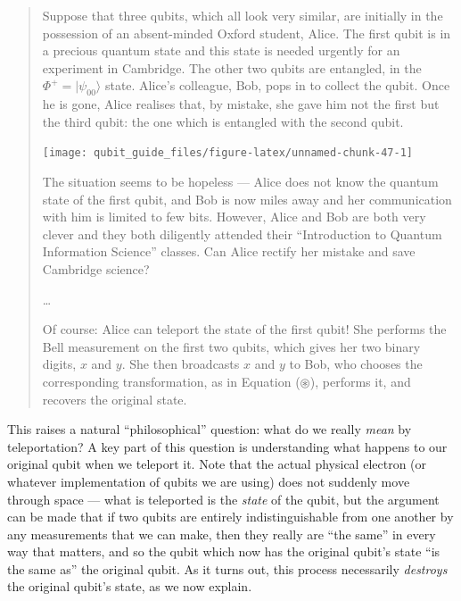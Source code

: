 \documentclass[fleqn,a4paper]{article}
\theoremstyle{definition}
\theoremstyle{definition}
\theoremstyle{definition}
\theoremstyle{definition}
\theoremstyle{remark}
\begin{document}
\begin{quote}
Suppose that three qubits, which all look very similar, are initially in the possession of an absent-minded Oxford student, Alice.
The first qubit is in a precious quantum state and this state is needed urgently for an experiment in Cambridge.
The other two qubits are entangled, in the \(\Phi^+=|\psi_{00}\rangle\) state. Alice's colleague, Bob, pops in to collect the qubit.
Once he is gone, Alice realises that, by mistake, she gave him not the first but the third qubit: the one which is entangled with the second qubit.

\begin{center}\texttt{[image: qubit\_guide\_files/figure-latex/unnamed-chunk-47-1]} \end{center}

The situation seems to be hopeless --- Alice does not know the quantum state of the first qubit, and Bob is now miles away and her communication with him is limited to few bits.
However, Alice and Bob are both very clever and they both diligently attended their ``Introduction to Quantum Information Science'' classes.
Can Alice rectify her mistake and save Cambridge science?

\ldots{}

Of course: Alice can teleport the state of the first qubit!
She performs the Bell measurement on the first two qubits, which gives her two binary digits, \(x\) and \(y\).
She then broadcasts \(x\) and \(y\) to Bob, who chooses the corresponding transformation, as in Equation (\(\circledast\)), performs it, and recovers the original state.
\end{quote}

This raises a natural ``philosophical'' question: what do we really \emph{mean} by teleportation?
A key part of this question is understanding what happens to our original qubit when we teleport it.
Note that the actual physical electron (or whatever implementation of qubits we are using) does not suddenly move through space --- what is teleported is the \emph{state} of the qubit, but the argument can be made that if two qubits are entirely indistinguishable from one another by any measurements that we can make, then they really are ``the same'' in every way that matters, and so the qubit which now has the original qubit's state ``is the same as'' the original qubit.
As it turns out, this process necessarily \emph{destroys} the original qubit's state, as we now explain.
\end{document}

